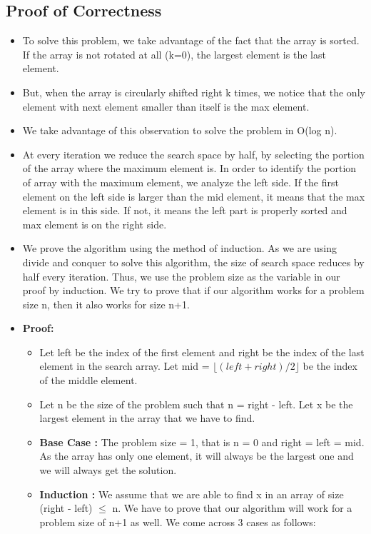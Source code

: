 \documentclass[12pt]{article}
\newcommand\floor[1]{\lfloor#1\rfloor}
\begin{document}
\subsection{Proof of Correctness}
\begin{itemize}
    \item To solve this problem, we take advantage of the fact that the array is sorted. If the array is not rotated at all (k=0), the largest element is the last element. 
    \item But, when the array is circularly shifted right k times, we notice that the only element with next element smaller than itself is the max element. 
    \item We take advantage of this observation to solve the problem in O(log n).
    \item At every iteration we reduce the search space by half, by selecting the portion of the array where the maximum element is. In order to identify the portion of array with the maximum element, we  analyze the left side. If the first element on the left side is larger than the mid element, it means that the max element is in this side. If not, it means the left part is properly sorted and max element is on the right side.
    \item We prove the algorithm using the method of induction. As we are using divide and conquer to solve this algorithm, the size of search space reduces by half every iteration. Thus, we use the problem size as the variable in our proof by induction. We try to prove that if our algorithm works for a problem size n, then it also works for size n+1.
    \item \textbf{Proof:}
    \begin{itemize}
        \item Let left be the index  of the first element and right be the index of the last element in the search array. Let mid = $\floor{(left + right)/2}$ be the index of the middle element. 
        \item Let n be the size of the problem such that n = right - left. Let x be the largest element in the array that we have to find.
        \item \textbf{Base Case : } The problem size = 1, that is n = 0 and right = left = mid. As the array has only one element, it will always be the largest one and we will always get the solution.
        \item \textbf{Induction : }We assume that we are able to find x in an array of size (right - left) $\leq$ n. We have to prove that our algorithm will work for a problem size of n+1 as well. We come across 3 cases as follows:

\end{itemize}
\end{itemize}
\end{document}
